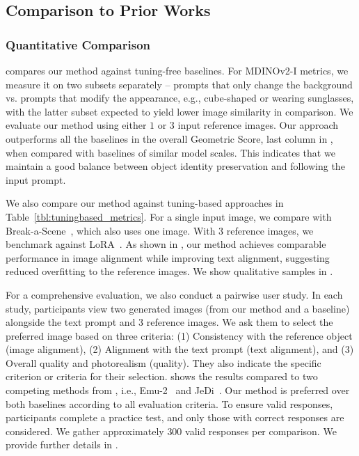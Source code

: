 \subsection{Comparison to Prior Works}

\subsubsection{Quantitative Comparison}
  compares our method against tuning-free baselines. For MDINOv2-I metrics, we measure it on two subsets separately -- prompts that only change the background vs. prompts that modify the appearance, e.g., {\menlo cube-shaped or wearing sunglasses}, with the latter subset expected to yield lower image similarity in comparison. We evaluate our method using either $1$ or $3$ input reference images. Our approach outperforms all the baselines in the overall Geometric Score, last column in , when compared with baselines of similar model scales. This indicates that we maintain a good balance between object identity preservation and following the input prompt. 

 \noindent We also compare our method against tuning-based approaches in Table~\ref{tbl:tuningbased_metrics}. For a single input image, we compare with Break-a-Scene~\cite{avrahami2023break}, which also uses one image. With $3$ reference images, we benchmark against LoRA~\cite{loraimplementation,dreamboothimpl}. As shown in , our method achieves comparable performance in image alignment while improving text alignment, suggesting reduced overfitting to the reference images. We show qualitative samples in .
 
For a comprehensive evaluation, we also conduct a pairwise user study.
In each study, participants view two generated images (from our method and a baseline) alongside the text prompt and $3$ reference images. We ask them to select the preferred image based on three criteria: (1) Consistency with the reference object (image alignment), (2) Alignment with the text prompt (text alignment), and (3) Overall quality and photorealism (quality). They also indicate the specific criterion or criteria for their selection.  shows the results compared to two competing methods from , i.e., Emu-2~\cite{Emu2} and JeDi~\cite{zeng2024jedi}. Our method is preferred over both baselines according to all evaluation criteria. To ensure valid responses, participants complete a practice test, and only those with correct responses are considered. We gather approximately $300$ valid responses per comparison. We provide further details in . 


